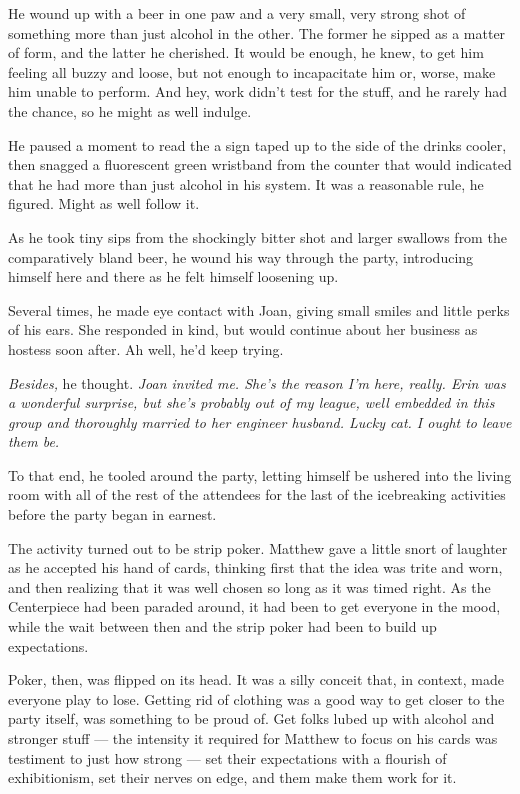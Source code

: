 He wound up with a beer in one paw and a very small, very strong shot of something more than just alcohol in the other. The former he sipped as a matter of form, and the latter he cherished. It would be enough, he knew, to get him feeling all buzzy and loose, but not enough to incapacitate him or, worse, make him unable to perform. And hey, work didn't test for the stuff, and he rarely had the chance, so he might as well indulge.

He paused a moment to read the a sign taped up to the side of the drinks cooler, then snagged a fluorescent green wristband from the counter that would indicated that he had more than just alcohol in his system. It was a reasonable rule, he figured. Might as well follow it.

As he took tiny sips from the shockingly bitter shot and larger swallows from the comparatively bland beer, he wound his way through the party, introducing himself here and there as he felt himself loosening up.

Several times, he made eye contact with Joan, giving small smiles and little perks of his ears. She responded in kind, but would continue about her business as hostess soon after. Ah well, he'd keep trying.

\emph{Besides,} he thought. \emph{Joan invited me. She's the reason I'm here, really. Erin was a wonderful surprise, but she's probably out of my league, well embedded in this group and thoroughly married to her engineer husband. Lucky cat. I ought to leave them be.}

To that end, he tooled around the party, letting himself be ushered into the living room with all of the rest of the attendees for the last of the icebreaking activities before the party began in earnest.

The activity turned out to be strip poker. Matthew gave a little snort of laughter as he accepted his hand of cards, thinking first that the idea was trite and worn, and then realizing that it was well chosen so long as it was timed right. As the Centerpiece had been paraded around, it had been to get everyone in the mood, while the wait between then and the strip poker had been to build up expectations.

Poker, then, was flipped on its head. It was a silly conceit that, in context, made everyone play to lose. Getting rid of clothing was a good way to get closer to the party itself, was something to be proud of. Get folks lubed up with alcohol and stronger stuff --- the intensity it required for Matthew to focus on his cards was testiment to just how strong --- set their expectations with a flourish of exhibitionism, set their nerves on edge, and them make them work for it.


